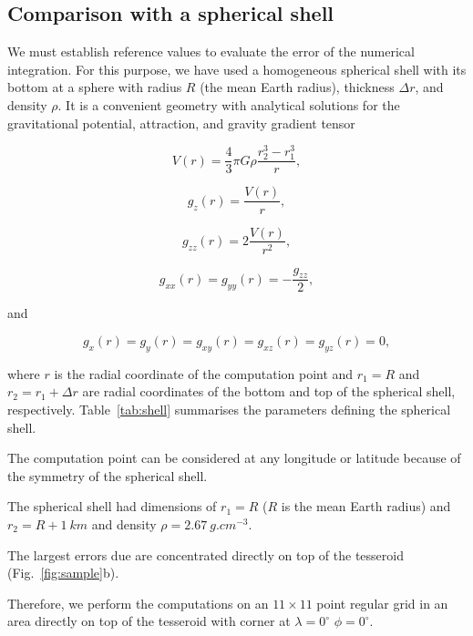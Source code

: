 \subsection{Comparison with a spherical shell}

We must establish reference values
to evaluate the error of the numerical integration.
For this purpose, we have used a homogeneous spherical shell
with its bottom at a sphere with radius $R$ (the mean Earth radius),
thickness $\Delta r$, and density $\rho$.
It is a convenient geometry
with analytical solutions for
the gravitational potential, attraction, and gravity gradient tensor
\citep{Grombein2013}

\begin{equation}
V(r) = \frac{4}{3}\pi G \rho \frac{r_2^3 - r_1^3}{r},
\end{equation}

\begin{equation}
g_z(r) = \frac{V(r)}{r},
\end{equation}

\begin{equation}
g_{zz}(r) = 2\frac{V(r)}{r^2},
\end{equation}

\begin{equation}
g_{xx}(r) = g_{yy}(r) = -\frac{g_{zz}}{2},
\end{equation}

\noindent
and

\begin{equation}
g_x(r) = g_y(r) = g_{xy}(r) = g_{xz}(r) = g_{yz}(r) = 0,
\end{equation}

\noindent
where $r$ is the radial coordinate of the computation point and
$r_1 = R$ and $r_2 = r_1 + \Delta r$ are radial coordinates
of the bottom and top of the spherical shell, respectively.
Table~\ref{tab:shell} summarises the parameters defining the spherical shell.

The computation point can be considered at any longitude or latitude because of
the symmetry of the spherical shell.

The spherical shell had dimensions of $r_1 = R$ ($R$ is the mean Earth radius) and $r_2 = R +
1\ km$ and density $\rho = 2.67\ g.cm^{-3}$.

The largest errors due are concentrated directly on top of the tesseroid
(Fig.~\ref{fig:sample}b).

Therefore, we perform the computations on an $11 \times 11$ point regular grid
in an area directly on top of the tesseroid with corner at $\lambda = 0^\circ$
$\phi = 0^\circ$.



